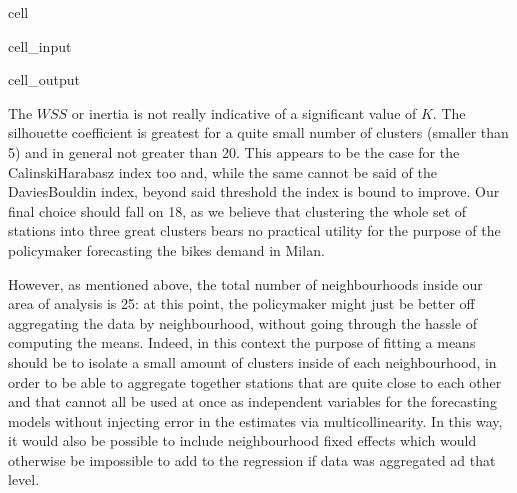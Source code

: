 \documentclass[letterpaper,10pt,english]{jupyterBook}
\begin{document}
\begin{sphinxuseclass}{cell}
\begin{sphinxuseclass}{cell_input}
\begin{sphinxVerbatim}[commandchars=\\\{\}]
          

         
          


    

\end{sphinxVerbatim}

\end{sphinxuseclass}
\begin{sphinxuseclass}{cell_output}
\noindent{}

\end{sphinxuseclass}
\end{sphinxuseclass}
\sphinxAtStartPar
The \(WSS\) or inertia is not really indicative of a significant value of \(K\). The silhouette coefficient is greatest for a quite small number of clusters (smaller than 5) and in general not greater than 20. This appears to be the case for the Calinski\sphinxhyphen{}Harabasz index too and, while the same cannot be said of the Davies\sphinxhyphen{}Bouldin index, beyond said threshold the index is bound to improve. Our final choice should fall on 18, as we believe that clustering the whole set of stations into three great clusters bears no practical utility for the purpose of the policymaker \sphinxhyphen{} forecasting the bikes demand in Milan.

\sphinxAtStartPar
However, as mentioned above, the total number of neighbourhoods inside our area of analysis is 25: at this point, the policymaker might just be better off aggregating the data by neighbourhood, without going through the hassle of computing the \sphinxhyphen{}means. Indeed, in this context the purpose of fitting a \sphinxhyphen{}means should be to isolate a small amount of clusters inside of each neighbourhood, in order to be able to aggregate together stations that are quite close to each other and that cannot all be used at once as independent variables for the forecasting models without injecting error in the estimates via multicollinearity. In this way, it would also be possible to include neighbourhood fixed effects \sphinxhyphen{} which would otherwise be impossible to add to the regression if data was aggregated ad that level.
\end{document}

